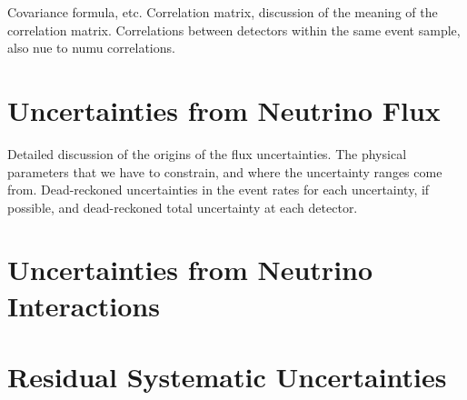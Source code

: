 Covariance formula, etc. Correlation matrix, discussion of the meaning of the correlation matrix.  Correlations between detectors within the same event sample, also nue to numu correlations.

\section{Uncertainties from Neutrino Flux}

\label{section:flux_uncert}

Detailed discussion of the origins of the flux uncertainties.  The physical parameters that we have to constrain, and where the uncertainty ranges come from.  Dead-reckoned uncertainties in the event rates for each uncertainty, if possible, and dead-reckoned total uncertainty at each detector.

\section{Uncertainties from Neutrino Interactions}

\section{Residual Systematic Uncertainties}